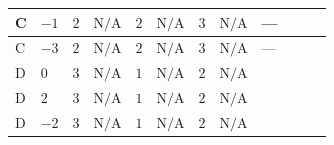 \documentclass[8pt]{article}
\begin{document}
\begin{landscape}
\begin{longtable}{@{}llcccccc >{\raggedright\arraybackslash}p{0.21\linewidth} >{\raggedright\arraybackslash}p{0.21\linewidth} >{\raggedright\arraybackslash}p{0.21\linewidth}@{}}
\midrule
C & $-1$ & $2$ & $\text{N/A}$ & $2$ & $\text{N/A}$ & $3$ & $\text{N/A}$ & --- & \scriptsize\adjustbox{max width=\linewidth}{$\begin{gathered} +2 {\lambda_{12}^{(1)}} {\lambda_5}\end{gathered}$} & \scriptsize\adjustbox{max width=\linewidth}{$\begin{gathered} +2 {\lambda_1} {\lambda_5}\end{gathered}$} \\
\midrule
C & $-3$ & $2$ & $\text{N/A}$ & $2$ & $\text{N/A}$ & $3$ & $\text{N/A}$ & --- & \scriptsize\adjustbox{max width=\linewidth}{$\begin{gathered} +2 {\lambda_{12}^{(1)}} {\lambda_5}\end{gathered}$} & \scriptsize\adjustbox{max width=\linewidth}{$\begin{gathered} +2 {\lambda_1} {\lambda_5}\end{gathered}$} \\
\midrule
D & $0$ & $3$ & $\text{N/A}$ & $1$ & $\text{N/A}$ & $2$ & $\text{N/A}$ & \scriptsize\adjustbox{max width=\linewidth}{$\begin{gathered} -\frac{9 {g_1}^2 {\lambda_5}}{2}\end{gathered}$} & \scriptsize\adjustbox{max width=\linewidth}{$\begin{gathered} +2 {\lambda_{12}^{(1)}} {\lambda_5}\end{gathered}$} & \scriptsize\adjustbox{max width=\linewidth}{$\begin{gathered} +2 {\lambda_1} {\lambda_5}\end{gathered}$} \\
\midrule
D & $2$ & $3$ & $\text{N/A}$ & $1$ & $\text{N/A}$ & $2$ & $\text{N/A}$ & \scriptsize\adjustbox{max width=\linewidth}{$\begin{gathered} -\frac{33 {g_1}^2 {\lambda_5}}{2}\end{gathered}$} & \scriptsize\adjustbox{max width=\linewidth}{$\begin{gathered} +2 {\lambda_{12}^{(1)}} {\lambda_5}\end{gathered}$} & \scriptsize\adjustbox{max width=\linewidth}{$\begin{gathered} +2 {\lambda_1} {\lambda_5}\end{gathered}$} \\
\midrule
D & $-2$ & $3$ & $\text{N/A}$ & $1$ & $\text{N/A}$ & $2$ & $\text{N/A}$ & \scriptsize\adjustbox{max width=\linewidth}{$\begin{gathered} -\frac{9 {g_1}^2 {\lambda_5}}{2}\end{gathered}$} & \scriptsize\adjustbox{max width=\linewidth}{$\begin{gathered} +2 {\lambda_{12}^{(1)}} {\lambda_5}\end{gathered}$} & \scriptsize\adjustbox{max width=\linewidth}{$\begin{gathered} +2 {\lambda_1} {\lambda_5}\end{gathered}$} \\

\end{longtable}
\end{landscape}
\end{document}
